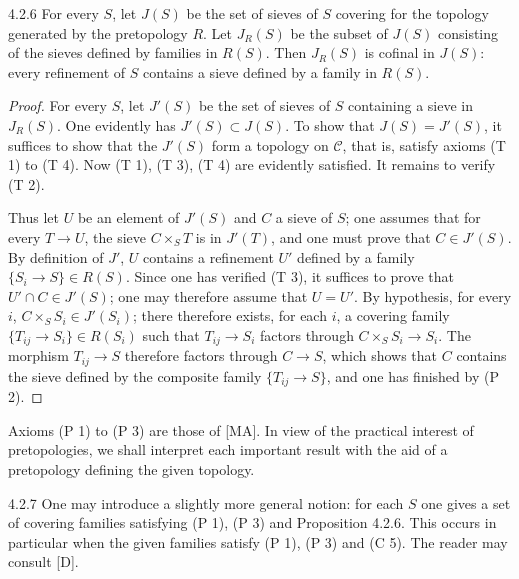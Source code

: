 \begin{proposition}{4.2.6}\label{IV.4.2.6}
For every \(S\), let \(J(S)\) be the set of sieves of \(S\) covering for the
topology generated by the pretopology \(R\). Let \(J_R(S)\) be the subset
of \(J(S)\) consisting of the sieves defined by families in \(R(S)\).
Then \(J_R(S)\) is cofinal in \(J(S)\): every refinement of \(S\) contains
a sieve defined by a family in \(R(S)\).
\end{proposition}
\begin{proof}
For every \(S\), let \(J'(S)\) be the set of sieves of \(S\) containing a
sieve in \(J_R(S)\). One evidently has \(J'(S)\subset J(S)\).
To show that \(J(S)=J'(S)\), it suffices to show that the \(J'(S)\) form a
topology on \(\mathcal C\), that is, satisfy axioms (T 1) to (T 4).
Now (T 1), (T 3), (T 4) are evidently satisfied. It remains to verify (T 2).

Thus let \(U\) be an element of \(J'(S)\) and \(C\) a sieve of \(S\);
one assumes that for every \(T\to U\), the sieve \(C\times_S T\) is in
\(J'(T)\), and one must prove that \(C\in J'(S)\).
By definition of \(J'\), \(U\) contains a refinement \(U'\) defined by a
family \(\{S_i\to S\}\in R(S)\). Since one has verified (T 3), it suffices
to prove that \(U'\cap C\in J'(S)\); one may therefore assume that \(U=U'\).
By hypothesis, for every \(i\), \(C\times_S S_i\in J'(S_i)\);
there therefore exists, for each \(i\), a covering family
\(\{T_{ij}\to S_i\}\in R(S_i)\) such that \(T_{ij}\to S_i\) factors through
\(C\times_S S_i\to S_i\). The morphism \(T_{ij}\to S\) therefore factors
through \(C\to S\), which shows that \(C\) contains the sieve defined by
the composite family \(\{T_{ij}\to S\}\), and one has finished by (P 2).
\end{proof}

Axioms (P 1) to (P 3) are those of [MA]. In view of the practical interest
of pretopologies, we shall interpret each important result with the aid
of a pretopology defining the given topology.

\begin{remark}{4.2.7}\label{IV.4.2.7}
One may introduce a slightly more general notion: for each \(S\) one gives
a set of covering families satisfying (P 1), (P 3) and Proposition 4.2.6.
This occurs in particular when the given families satisfy (P 1), (P 3)
and (C 5). The reader may consult [D].
\end{remark}

